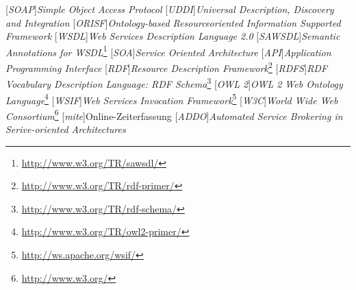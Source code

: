 
[\emph{SOAP}]{\emph{Simple Object Access Protocol}}
[\emph{UDDI}]{\emph{Universal Description, Discovery and Integration}}
[\emph{ORISF}]{\emph{Ontology-based Resourceoriented Information Supported Framework}}
[\emph{WSDL}]{\emph{Web Services Description Language 2.0}}
[\emph{SAWSDL}]{\emph{Semantic Annotations for WSDL}\footnote{\url{http://www.w3.org/TR/sawsdl/}}}
[\emph{SOA}]{\emph{Service Oriented Architecture}}
[\emph{API}]{\emph{Application Programming Interface}}
[\emph{RDF}]{\emph{Resource Description Framework}\footnote{\url{http://www.w3.org/TR/rdf-primer/}}}
[\emph{RDFS}]{\emph{RDF Vocabulary Description Language: RDF Schema}\footnote{\url{http://www.w3.org/TR/rdf-schema/}}}
[\emph{OWL 2}]{\emph{OWL 2 Web Ontology Language}\footnote{\url{http://www.w3.org/TR/owl2-primer/}}}
[\emph{WSIF}]{\emph{Web Services Invocation Framework}\footnote{\url{http://ws.apache.org/wsif/}}}
[\emph{W3C}]{\emph{World Wide Web Consortium}\footnote{\url{http://www.w3.org/}}}
[\emph{mite}]{Online-Zeiterfassung}
[\emph{ADDO}]{\emph{Automated Service Brokering in Serive-oriented Architectures}}


\newcommand{\restapi}{\emph{RESTful} \ac{API} }
\newcommand{\restapis}{\emph{RESTful} \ac{API}\emph{s} }